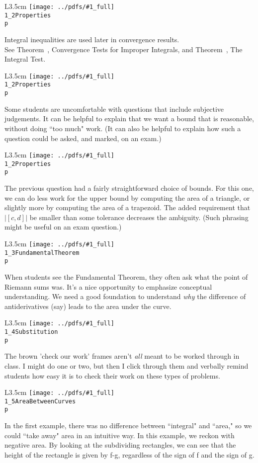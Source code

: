 \documentclass{beamer}
\newcommand{\notefig}[3]{%
	\begin{wrapfigure}{L}{3.5cm}
	\texttt{[image: ../pdfs/\#1\_full]}\\
	\footnotesize
	\texttt{#2}\\
	 \texttt{p \pageref{#3}}
	\end{wrapfigure}
	}
\begin{document}
%
\begin{frame}
\notefig{1_2Properties}{1\_2Properties}{note1.2b}
Integral inequalities are used later in convergence results. \\[1em]

See Theorem~, Convergence Tests for Improper Integrals, and Theorem~, The Integral Test.
\end{frame}
%
\begin{frame}
\notefig{1_2Properties}{1\_2Properties}{note1.2c}
Some students are uncomfortable with questions that include subjective judgements.
It can be helpful to explain that we want a bound that is reasonable, without doing ``too much" work. (It can also be helpful to explain how such a question could be asked, and marked, on an exam.)
\end{frame}
%
\begin{frame}
\notefig{1_2Properties}{1\_2Properties}{note1.2d}
 The previous question had a fairly straightforward choice of bounds. For this one, we can do less work for the upper bound by computing the area of a triangle, or slightly more by computing the area of a trapezoid. 
 \vfill
 The added requirement that $|[c,d]|$ be smaller than some tolerance decreases the ambiguity. (Such phrasing might be useful on an exam question.)
\end{frame}
%
\begin{frame}
\notefig{1_3FundamentalTheorem}{1\_3Fundamental\linebreak Theorem}{note1.3a}
\vfill
When students see the Fundamental Theorem, they often ask what the point of Riemann sums was. It's a nice opportunity to emphasize conceptual understanding. We need a good foundation to understand \textit{why} the difference of antiderivatives (say) leads to the area under the curve.

\end{frame}
%
\begin{frame}

\notefig{1_4Substitution}{1\_4Substitution}{note1.4a}
The brown 'check our work' frames aren't \textit{all} meant to be worked through in class. I might do one or two, but then I click through them and verbally remind students how easy it is to check their work on these types of problems.

\end{frame}
%
\begin{frame}

\notefig{1_5AreaBetweenCurves}{1\_5AreaBetweenCurves}{note1.5a}

In the first example, there was no difference between ``integral" and ``area," so we could ``take away" area in an intuitive way. In this example, we reckon with negative area. By looking at the subdividing rectangles, we can see that the height of the rectangle is given by f-g, regardless of the sign of f and the sign of g.

\end{frame}
\end{document}
